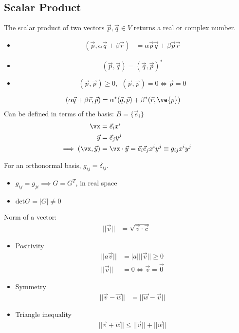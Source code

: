 \documentclass[cplx.tex]{subfiles}
\begin{document}
\subsection{Scalar Product}
The scalar product of two vectors $\vec{p},\vec{q} \in V$ returns a real or complex number. 
\begin{itemize}
    \item 
        \begin{align}
            (\vec{p},\alpha\vec{q}+\beta\vec{r}) &= \alpha\vec{p}\vec{q} + \beta\vec{p}\vec{r}
        \end{align}
    \item 
        \begin{equation}
            (\vec{p},\vec{q}) = (\vec{q},\vec{p})^* 
        \end{equation}
    \item 
        \begin{equation}
            (\vec{p},\vec{p}) \geq 0, ~~(\vec{p},\vec{p}) = 0 \iff \vec{p} = 0
        \end{equation}
\end{itemize}
\begin{align}
    (\alpha\vec{q}+\beta\vec{r},\vec{p}) &= \alpha^*(\vec{q},\vec{p}) + \beta^*(\vec{r},\ve{p})
\end{align}
Can be defined in terms of the basis: $B = \{\vec{e}_i\}$
\begin{align}
    \vx &= \vec{e}_ix^i \\
    \vec{y} &= \vec{e}_jy^j \\
    \implies (\vx,\vec{y}) &= \vx\cdot\vec{y} = \vec{e}_i\vec{e}_jx^iy^j \equiv g_{ij}x^iy^j
\end{align}

For an orthonormal basis, $g_{ij} = \delta_{ij}$.
\begin{itemize}
    \item $g_{ij} = g_{ji} \implies G = G^T$, in real space
    \item $\text{det}G = |G| \neq 0$
\end{itemize}

Norm of a vector:
\begin{align}
    ||\vec{v}|| &= \sqrt{\vec{v}\cdot\vec{c}}
\end{align}
\begin{itemize}
    \item Positivity
        \begin{align}
            ||a\vec{v}|| &= |a|||\vec{v}|| \geq 0 \\
            ||\vec{v}|| &= 0 \iff \vec{v} = \vec{0}
        \end{align}
    \item Symmetry
        \begin{align}
            ||\vec{v}-\vec{w}|| &= ||\vec{w}-\vec{v}||
        \end{align}
    \item Triangle inequality
        \begin{align}
            ||\vec{v}+\vec{w}|| \leq ||\vec{v}|| + ||\vec{w}||
        \end{align}
\end{itemize}
\end{document}
